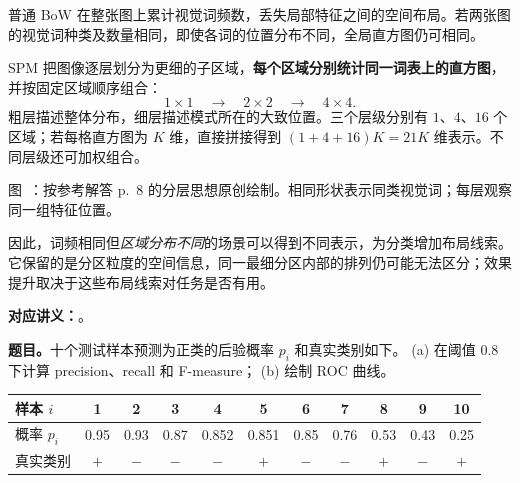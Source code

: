 \begin{checkedsolution}
普通 BoW 在整张图上累计视觉词频数，丢失局部特征之间的空间布局。若两张图的视觉词种类及数量相同，即使各词的位置分布不同，全局直方图仍可相同。

SPM 把图像逐层划分为更细的子区域，\textbf{每个区域分别统计同一词表上的直方图}，并按固定区域顺序组合：
\[
  1\times1\quad\longrightarrow\quad2\times2\quad\longrightarrow\quad4\times4.
\]
粗层描述整体分布，细层描述模式所在的大致位置。三个层级分别有 $1$、$4$、$16$ 个区域；若每格直方图为 $K$ 维，直接拼接得到 $(1+4+16)K=21K$ 维表示。不同层级还可加权组合。

\begin{center}
  
  \par\smallskip
  \label{fig:sc4061-tut06-spm}
  {\small 图~\thefigure：按参考解答 p.~8 的分层思想原创绘制。相同形状表示同类视觉词；每层观察同一组特征位置。}
\end{center}

因此，词频相同但\emph{区域分布不同}的场景可以得到不同表示，为分类增加布局线索。它保留的是分区粒度的空间信息，同一最细分区内部的排列仍可能无法区分；效果提升取决于这些布局线索对任务是否有用。
\end{checkedsolution}


\textbf{对应讲义：}。

\textbf{题目。}十个测试样本预测为正类的后验概率 $p_i$ 和真实类别如下。
(a) 在阈值 $0.8$ 下计算 precision、recall 和 F-measure；
(b) 绘制 ROC 曲线。

\begin{center}
\small
\setlength{\tabcolsep}{4pt}
\begin{tabular}{@{}l*{10}{c}@{}}
\toprule
样本 $i$ & 1 & 2 & 3 & 4 & 5 & 6 & 7 & 8 & 9 & 10 \\
\midrule
概率 $p_i$ & 0.95 & 0.93 & 0.87 & 0.852 & 0.851 & 0.85 & 0.76 & 0.53 & 0.43 & 0.25 \\
真实类别 & $+$ & $-$ & $-$ & $-$ & $+$ & $-$ & $-$ & $+$ & $-$ & $+$ \\
\bottomrule
\end{tabular}
\end{center}

